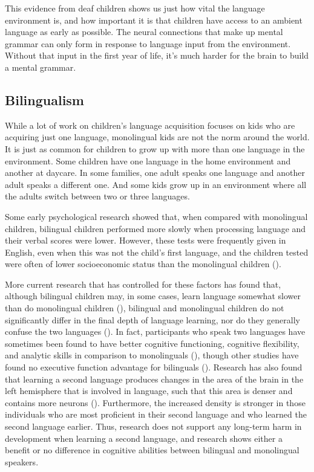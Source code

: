 \documentclass[
]{krantz}
\begin{document}
This evidence from deaf children shows us just how vital the language environment is, and how important it is that children have access to an ambient language as early as possible. The neural connections that make up mental grammar can only form in response to language input from the environment. Without that input in the first year of life, it's much harder for the brain to build a mental grammar.

\subsection*{Bilingualism}\label{bilingualism}


While a lot of work on children's language acquisition focuses on kids who are acquiring just one language, monolingual kids are not the norm around the world. It is just as common for children to grow up with more than one language in the environment. Some children have one language in the home environment and another at daycare. In some families, one adult speaks one language and another adult speaks a different one. And some kids grow up in an environment where all the adults switch between two or three languages.

Some early psychological research showed that, when compared with monolingual children, bilingual children performed more slowly when processing language and their verbal scores were lower. However, these tests were frequently given in English, even when this was not the child's first language, and the children tested were often of lower socioeconomic status than the monolingual children ().

More current research that has controlled for these factors has found that, although bilingual children may, in some cases, learn language somewhat slower than do monolingual children (), bilingual and monolingual children do not significantly differ in the final depth of language learning, nor do they generally confuse the two languages (). In fact, participants who speak two languages have sometimes been found to have better cognitive functioning, cognitive flexibility, and analytic skills in comparison to monolinguals (), though other studies have found no executive function advantage for bilinguals (). Research has also found that learning a second language produces changes in the area of the brain in the left hemisphere that is involved in language, such that this area is denser and contains more neurons (). Furthermore, the increased density is stronger in those individuals who are most proficient in their second language and who learned the second language earlier. Thus, research does not support any long-term harm in development when learning a second language, and research shows either a benefit or no difference in cognitive abilities between bilingual and monolingual speakers.
\end{document}
